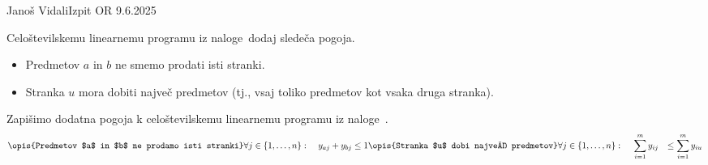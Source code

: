 \begin{naloga}{Janoš Vidali}{Izpit OR 9.6.2025}
\begin{vprasanje}
Celoštevilskemu linearnemu programu iz naloge~\nal[zavist]
dodaj sledeča pogoja.
\begin{itemize}
\item Predmetov $a$ in $b$ ne smemo prodati isti stranki.
\item Stranka $u$ mora dobiti največ predmetov
(tj., vsaj toliko predmetov kot vsaka druga stranka).
\end{itemize}
\end{vprasanje}

\begin{odgovor}
Zapišimo dodatna pogoja k celoštevilskemu linearnemu programu
iz naloge~\res[zavist].
\baselineskip
\begin{alignat*}{3}
\opis{Predmetov $a$ in $b$ ne prodamo isti stranki}
\forall j \in \{1, \dots, n\}: &\ &
y_{aj} + y_{bj} &\le 1
\opis{Stranka $u$ dobi največ predmetov}
\forall j \in \{1, \dots, n\}: &\ &
\sum_{i=1}^m y_{ij} &\le \sum_{i=1}^m y_{iu}
\end{alignat*}
\end{odgovor}
\end{naloga}
